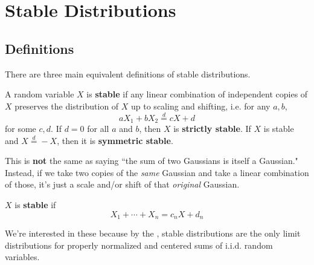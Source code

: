 \documentclass[twoside,10pt]{report}
\begin{document}
\tableofcontents
{}




\chapter{Stable Distributions}

\section{Definitions}

There are three main equivalent definitions of stable distributions.

\begin{defn}[]
A random variable $X$ is \textbf{stable} if any linear combination of independent copies of $X$ preserves the distribution of $X$ up to scaling and shifting, i.e. for any $a,b$,
\[
a X_1 + b X_2 \stackrel{d}{=} c X + d
\] for some $c,d$. If $d=0$ for all $a$ and $b$, then $X$ is \textbf{strictly stable}. If $X$ is stable and $X \stackrel{d}{=} -X$, then it is \textbf{symmetric stable}.
\end{defn}

This is \textbf{not} the same as saying ``the sum of two Gaussians is itself a Gaussian." Instead, if we take two copies of the \emph{same} Gaussian and take a linear combination of those, it's just a scale and/or shift of that \emph{original} Gaussian.

\begin{defn}[]
$X$ is \textbf{stable} if
\[
X_1 + \cdots + X_{n} = c_{n}X + d_{n}
\] 

\end{defn}

We're interested in these because by the , stable distributions are the only limit distributions for properly normalized and centered sums of i.i.d. random variables.


\end{document}
